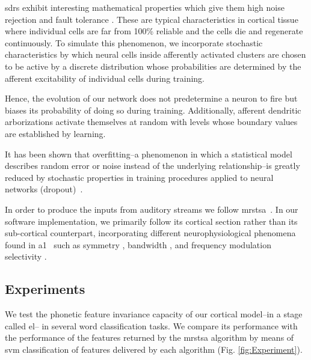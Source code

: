 \documentclass[10pt,letterpaper]{article}
\begin{document}
\glspl{sdr} exhibit interesting mathematical properties which give them high noise rejection and fault tolerance \cite{ahmad_2015}.
These are typical characteristics in cortical tissue where individual cells are far from 100\% reliable and the cells die and regenerate continuously. To simulate this phenomenon, we incorporate stochastic characteristics by which neural cells inside afferently activated clusters are chosen to be active by a discrete distribution whose probabilities are determined by the afferent excitability of individual cells during training.

Hence, the evolution of our network does not predetermine a neuron to fire but biases its probability of doing so during training. Additionally, afferent dendritic arborizations activate themselves at random with levels whose boundary values are established by learning. 

It has been shown that overfitting--a phenomenon in which a statistical model describes random error or noise instead of the underlying relationship--is greatly reduced by stochastic properties in training procedures applied to neural networks (dropout)~\cite{JMLR:v15:srivastava14a}.

In order to produce the inputs from auditory streams we follow  \gls{mrstsa}~\cite{chi_2005}. In our software implementation, we primarily follow its cortical section rather than its sub-cortical counterpart, incorporating different neurophysiological phenomena found in \gls{a1}~\cite{wang_1995} such as symmetry \cite{shamma_1993}, bandwidth \cite{schreiner_1990}, and frequency modulation selectivity \cite{shamma_1993,heil_1992,mendelson_1985}.

\subsection*{Experiments}

We test the phonetic feature invariance capacity of our cortical model--in a stage called \gls{el}-- 
in several word classification tasks. We compare its performance with the performance of the features returned by the \gls{mrstsa} algorithm by means of \gls{svm} classification of features delivered by each algorithm (Fig. \ref{fig:Experiment}).
\end{document}
